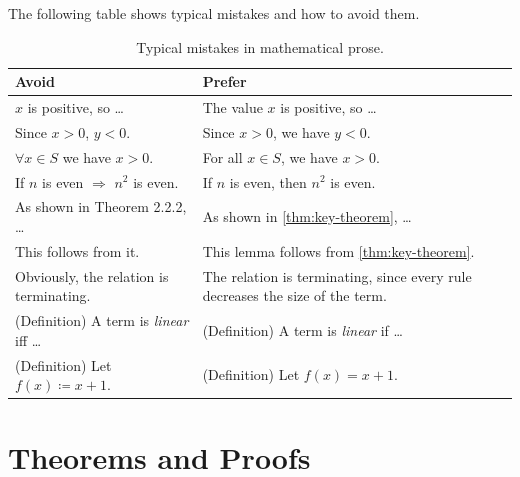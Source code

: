 The following table shows typical mistakes and how to avoid them.

\begin{table}[H]
    \centering
    \caption{Typical mistakes in mathematical prose.}
    \label{tab:mw-mistakes}
    \begin{tabular}{p{}p{}}
        \toprule
        \textbf{Avoid} & \textbf{Prefer} \\
        \midrule
        $x$ is positive, so \ldots
        & The value $x$ is positive, so \ldots \\
        \addlinespace
        Since $x > 0$, $y < 0$.
        & Since $x > 0$, we have $y < 0$. \\
        \addlinespace
        $\forall x \in S$ we have $x > 0$.
        & For all $x \in S$, we have $x > 0$. \\
        \addlinespace
        If $n$ is even $\Rightarrow$ $n^2$ is even.
        & If $n$ is even, then $n^2$ is even. \\
        \addlinespace
        As shown in Theorem 2.2.2, \ldots
        & As shown in \cref{thm:key-theorem}, \ldots \\
        \addlinespace
        This follows from it.
        & This lemma follows from \cref{thm:key-theorem}. \\
        \addlinespace
        Obviously, the relation is terminating.
        & The relation is terminating, since every rule decreases the size
          of the term. \\
        \addlinespace
        (Definition) A term is \emph{linear} iff \ldots
        & (Definition) A term is \emph{linear} if \ldots \\
        \addlinespace
        (Definition) Let $f(x) \coloneqq x + 1$.
        & (Definition) Let $f(x) = x + 1$. \\
        \bottomrule
    \end{tabular}
\end{table}

\section{Theorems and Proofs}\label{sec:mw-proofs}

